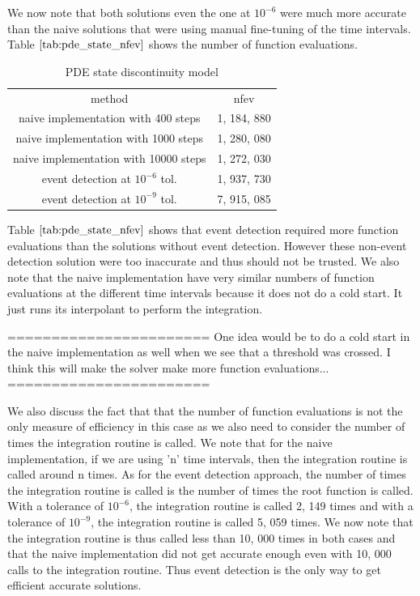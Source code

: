 \documentclass{article}
\begin{document}
We now note that both solutions even the one at $10^{-6}$ were much more accurate than the naive solutions that were using manual fine-tuning of the time intervals. Table $\ref{tab:pde_state_nfev}$ shows the number of function evaluations. 

\begin{table}[h]
\caption {PDE state discontinuity model} 
\label{tab:pde_state_nfev}
\begin{center}
\begin{tabular}{ c c } 
method & nfev \\ 
naive implementation with 400 steps   & 1, 184, 880 \\
naive implementation with 1000 steps  & 1, 280, 080 \\
naive implementation with 10000 steps & 1, 272, 030 \\
event detection at $10^{-6}$ tol.     & 1, 937, 730 \\
event detection at $10^{-9}$ tol.     & 7, 915, 085 \\
\end{tabular}
\end{center}
\end{table}

Table $\ref{tab:pde_state_nfev}$ shows that event detection required more function evaluations than the solutions without event detection. However these non-event detection solution were too inaccurate and thus should not be trusted. We also note that the naive implementation have very similar numbers of function evaluations at the different time intervals because it does not do a cold start. It just runs its interpolant to perform the integration.

=======================
One idea would be to do a cold start in the naive implementation as well when we see that a threshold was crossed. I think this will make the solver make more function evaluations...
=======================

We also discuss the fact that that the number of function evaluations is not the only measure of efficiency in this case as we also need to consider the number of times the integration routine is called. We note that for the naive implementation, if we are using 'n' time intervals, then the integration routine is called around n times. As for the event detection approach, the number of times the integration routine is called is the number of times the root function is called. With a tolerance of $10^{-6}$, the integration routine is called 2, 149 times and with a tolerance of $10^{-9}$, the integration routine is called 5, 059 times. We now note that the integration routine is thus called less than 10, 000 times in both cases and that the naive implementation did not get accurate enough even with 10, 000 calls to the integration routine. Thus event detection is the only way to get efficient accurate solutions.
\end{document}
